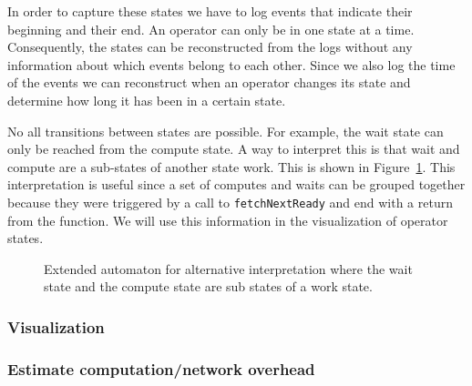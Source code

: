 \documentclass[11pt]{article}
\begin{document}
In order to capture these states we have to log events that indicate their beginning and their end. An operator can only be in one state at a time. Consequently, the states can be reconstructed from the logs without any information about which events belong to each other. Since we also log the time of the events we can reconstruct when an operator changes its state and determine how long it has been in a certain state.

No all transitions between states are possible. For example, the wait state can only be reached from the compute state. A way to interpret this is that wait and compute are a sub-states of another state work. This is shown in Figure~\ref{fig:extd_compute}. This interpretation is useful since a set of computes and waits can be grouped together because they were triggered by a call to \texttt{fetchNextReady} and end with a return from the function. We will use this information in the visualization of operator states.

\begin{figure}
  \begin{center}
    \def\svgwidth{0.4\columnwidth}
    
  \end{center}
  \caption{Extended automaton for alternative interpretation where the wait state and the compute state are sub states of a work state.}
  \label{fig:extd_compute}
\end{figure}


	\subsubsection*{Visualization}
	
	\subsubsection*{Estimate computation/network overhead}

\end{document}
